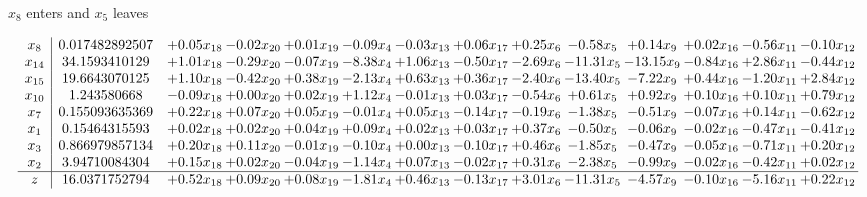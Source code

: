 \documentclass[8pt]{article}
\begin{document}
 $ x_{8} $ enters and $ x_{5} $ leaves 

 \[\begin{array}{c| c c@{\hskip 2pt} c@{\hskip 2pt} c@{\hskip 2pt} c@{\hskip 2pt} c@{\hskip 2pt} c@{\hskip 2pt} c@{\hskip 2pt} c@{\hskip 2pt} c@{\hskip 2pt} c@{\hskip 2pt} c@{\hskip 2pt} c@{\hskip 2pt} }
 x_{8}   &  0.017482892507 & +  0.05 x_{18} & -0.02 x_{20} & +  0.01 x_{19} & -0.09 x_{4} & -0.03 x_{13} & +  0.06 x_{17} & +  0.25 x_{6} & -0.58 x_{5} & +  0.14 x_{9} & +  0.02 x_{16} & -0.56 x_{11} & -0.10 x_{12}\\
 x_{14}   &  34.1593410129 & +  1.01 x_{18} & -0.29 x_{20} & -0.07 x_{19} & -8.38 x_{4} & +  1.06 x_{13} & -0.50 x_{17} & -2.69 x_{6} & -11.31 x_{5} & -13.15 x_{9} & -0.84 x_{16} & +  2.86 x_{11} & -0.44 x_{12}\\
 x_{15}   &  19.6643070125 & +  1.10 x_{18} & -0.42 x_{20} & +  0.38 x_{19} & -2.13 x_{4} & +  0.63 x_{13} & +  0.36 x_{17} & -2.40 x_{6} & -13.40 x_{5} & -7.22 x_{9} & +  0.44 x_{16} & -1.20 x_{11} & +  2.84 x_{12}\\
 x_{10}   &  1.243580668 & -0.09 x_{18} & +  0.00 x_{20} & +  0.02 x_{19} & +  1.12 x_{4} & -0.01 x_{13} & +  0.03 x_{17} & -0.54 x_{6} & +  0.61 x_{5} & +  0.92 x_{9} & +  0.10 x_{16} & +  0.10 x_{11} & +  0.79 x_{12}\\
 x_{7}   &  0.155093635369 & +  0.22 x_{18} & +  0.07 x_{20} & +  0.05 x_{19} & -0.01 x_{4} & +  0.05 x_{13} & -0.14 x_{17} & -0.19 x_{6} & -1.38 x_{5} & -0.51 x_{9} & -0.07 x_{16} & +  0.14 x_{11} & -0.62 x_{12}\\
 x_{1}   &  0.15464315593 & +  0.02 x_{18} & +  0.02 x_{20} & +  0.04 x_{19} & +  0.09 x_{4} & +  0.02 x_{13} & +  0.03 x_{17} & +  0.37 x_{6} & -0.50 x_{5} & -0.06 x_{9} & -0.02 x_{16} & -0.47 x_{11} & -0.41 x_{12}\\
 x_{3}   &  0.866979857134 & +  0.20 x_{18} & +  0.11 x_{20} & -0.01 x_{19} & -0.10 x_{4} & +  0.00 x_{13} & -0.10 x_{17} & +  0.46 x_{6} & -1.85 x_{5} & -0.47 x_{9} & -0.05 x_{16} & -0.71 x_{11} & +  0.20 x_{12}\\
 x_{2}   &  3.94710084304 & +  0.15 x_{18} & +  0.02 x_{20} & -0.04 x_{19} & -1.14 x_{4} & +  0.07 x_{13} & -0.02 x_{17} & +  0.31 x_{6} & -2.38 x_{5} & -0.99 x_{9} & -0.02 x_{16} & -0.42 x_{11} & +  0.02 x_{12}\\
\hline
z    &  16.0371752794 & +  0.52 x_{18} & +  0.09 x_{20} & +  0.08 x_{19} & -1.81 x_{4} & +  0.46 x_{13} & -0.13 x_{17} & +  3.01 x_{6} & -11.31 x_{5} & -4.57 x_{9} & -0.10 x_{16} & -5.16 x_{11} & +  0.22 x_{12}\\
\end{array}\]
\end{document}
